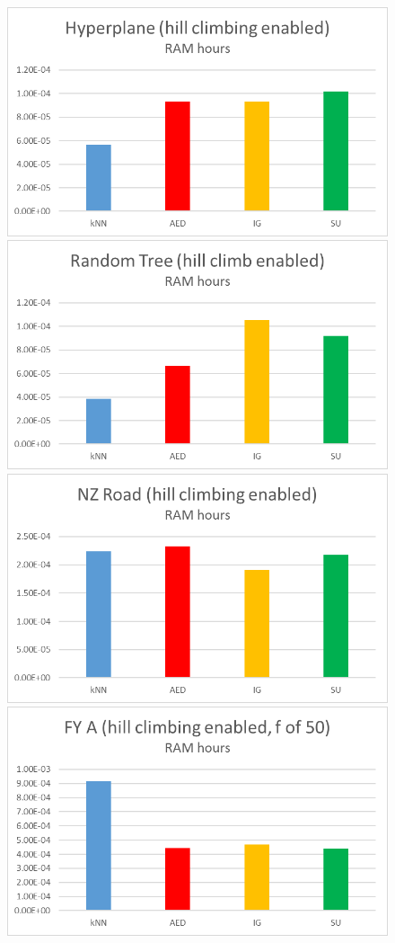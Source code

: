 \begin{figure}[hp]
\includegraphics[scale=0.17]{Graphs/Hyperplane/H_mem}
\includegraphics[scale=0.17]{Graphs/TreeD10/H_mem}
\includegraphics[scale=0.17]{Graphs/NZRoad/H_mem}
\includegraphics[scale=0.17]{Graphs/FY_A/H_mem}

\end{figure}
